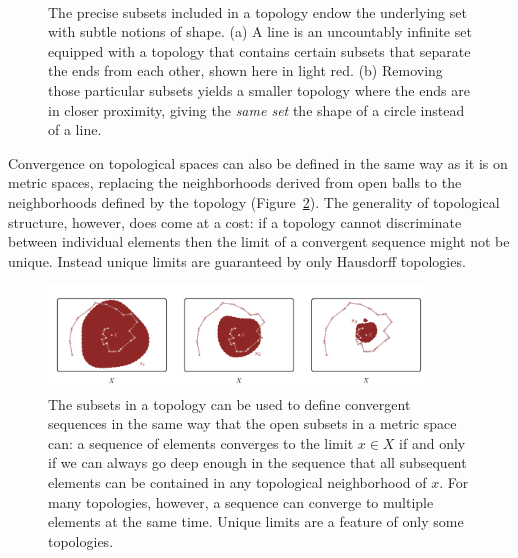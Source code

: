 \documentclass[
  letterpaper,
  DIV=11,
  numbers=noendperiod]{scrartcl}
\begin{document}
\begin{figure}
\begin{minipage}[t]{0.45\linewidth}
\subcaption{\label{fig-circle-topology}}
\end{minipage}%
%
\begin{minipage}[t]{0.05\linewidth}

{\centering 

~

}

\end{minipage}%

\caption{\label{fig-line-verses-circle}The precise subsets included in a
topology endow the underlying set with subtle notions of shape. (a) A
line is an uncountably infinite set equipped with a topology that
contains certain subsets that separate the ends from each other, shown
here in light red. (b) Removing those particular subsets yields a
smaller topology where the ends are in closer proximity, giving the
\emph{same set} the shape of a circle instead of a line.}

\end{figure}

Convergence on topological spaces can also be defined in the same way as
it is on metric spaces, replacing the neighborhoods derived from open
balls to the neighborhoods defined by the topology
(Figure~\ref{fig-general-convergence}). The generality of topological
structure, however, does come at a cost: if a topology cannot
discriminate between individual elements then the limit of a convergent
sequence might not be unique. Instead unique limits are guaranteed by
only Hausdorff topologies.

\begin{figure}

{\centering \includegraphics[width=0.9\textwidth,height=\textheight]{figures/structures/general_topology/convergence/convergence.pdf}

}

\caption{\label{fig-general-convergence}The subsets in a topology can be
used to define convergent sequences in the same way that the open
subsets in a metric space can: a sequence of elements converges to the
limit \(x \in X\) if and only if we can always go deep enough in the
sequence that all subsequent elements can be contained in any
topological neighborhood of \(x\). For many topologies, however, a
sequence can converge to multiple elements at the same time. Unique
limits are a feature of only some topologies.}

\end{figure}
\end{document}
